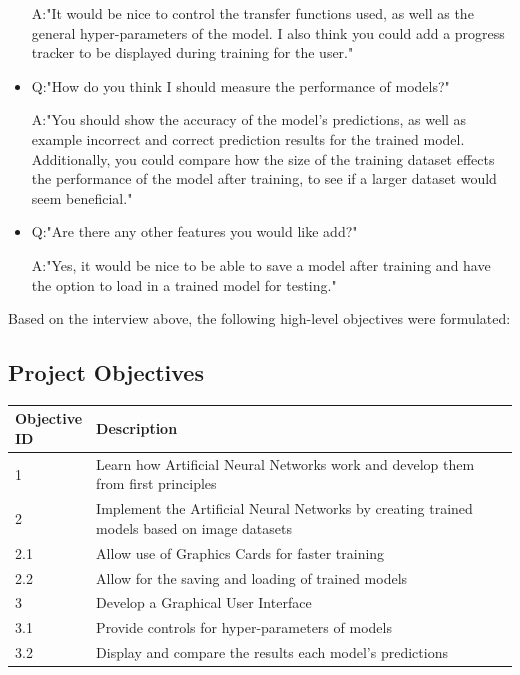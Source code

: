 \documentclass[./project-report/src/latex/project-report.tex]{subfiles}
\begin{document}
\begin{itemize}
          A:"It would be nice to control the transfer functions used, as well as the general hyper-parameters of the model. I also think you could add a progress tracker 
             to be displayed during training for the user."
    \item Q:"How do you think I should measure the performance of models?"

          A:"You should show the accuracy of the model's predictions, as well as example incorrect and correct prediction results for the trained model. Additionally, 
             you could compare how the size of the training dataset effects the performance of the model after training, to see if a larger dataset would seem 
             beneficial."
    \item Q:"Are there any other features you would like add?"

          A:"Yes, it would be nice to be able to save a model after training and have the option to load in a trained model for testing."
\end{itemize}

Based on the interview above, the following high-level objectives were formulated:

\subsection{Project Objectives}

\begin{tabular}{|p{0.13\linewidth}|p{0.87\linewidth}|}
      \hline
      \textbf{Objective ID} & \textbf{Description} \\
      \hline
      1 & Learn how Artificial Neural Networks work and develop them from first principles \\
      \hline
      2 & Implement the Artificial Neural Networks by creating trained models based on image datasets \\
      \hline
      2.1 & Allow use of Graphics Cards for faster training \\
      \hline
      2.2 & Allow for the saving and loading of trained models \\
      \hline
      3 & Develop a Graphical User Interface \\
      \hline
      3.1 & Provide controls for hyper-parameters of models \\
      \hline
      3.2 & Display and compare the results each model's predictions \\
      \hline
\end{tabular}
\end{document}
